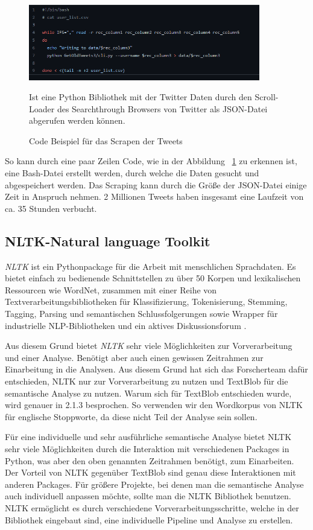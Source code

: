 	\begin{figure}[ht]
		\centering
		\includegraphics[width=0.9\textwidth]{images/Kapitel2/Code_Beispiel_1}
			\caption{\label{fig:CodeBeispiel}Code Beispiel für das Scrapen der Tweets}{Ist eine Python Bibliothek mit der Twitter Daten durch den Scroll-Loader des Searchthrough Browsers von Twitter als JSON-Datei abgerufen werden können.}
	\end{figure}
	
So kann durch eine paar Zeilen Code, wie in der Abbildung ~\ref{fig:CodeBeispiel} zu erkennen ist, eine Bash-Datei erstellt werden, durch welche die Daten gesucht und abgespeichert werden. Das Scraping kann durch die Größe der JSON-Datei einige Zeit in Anspruch nehmen. 2 Millionen Tweets haben insgesamt eine Laufzeit von ca. 35 Stunden verbucht.

\subsection{NLTK-Natural language Toolkit}
	
\textit{NLTK} ist ein Pythonpackage für die Arbeit mit menschlichen Sprachdaten. Es bietet einfach zu bedienende Schnittstellen zu über 50 Korpen und lexikalischen Ressourcen wie WordNet, zusammen mit einer Reihe von Textverarbeitungsbibliotheken für Klassifizierung, Tokenisierung, Stemming, Tagging, Parsing und semantischen Schlussfolgerungen sowie Wrapper für industrielle NLP-Bibliotheken und ein aktives Diskussionsforum .
	
Aus diesem Grund bietet \textit{NLTK} sehr viele Möglichkeiten zur Vorverarbeitung und einer Analyse. Benötigt aber auch einen gewissen Zeitrahmen zur Einarbeitung in die Analysen. Aus diesem Grund hat sich das Forscherteam dafür entschieden, NLTK nur zur Vorverarbeitung zu nutzen und TextBlob für die semantische Analyse zu nutzen. Warum sich für TextBlob entschieden wurde, wird genauer in 2.1.3 besprochen. So verwenden wir den Wordkorpus von NLTK für englische Stoppworte, da diese nicht Teil der Analyse sein sollen.
	
Für eine individuelle und sehr ausführliche semantische Analyse bietet NLTK sehr viele Möglichkeiten durch die Interaktion mit verschiedenen Packages in Python, was aber den oben genannten Zeitrahmen benötigt, zum Einarbeiten. Der Vorteil von NLTK gegenüber TextBlob sind genau diese Interaktionen mit anderen Packages. Für größere Projekte, bei denen man die semantische Analyse auch individuell anpassen möchte, sollte man die NLTK Bibliothek benutzen. NLTK ermöglicht es durch verschiedene Vorverarbeitungsschritte, welche in der Bibliothek eingebaut sind, eine individuelle Pipeline und Analyse zu erstellen.
	
